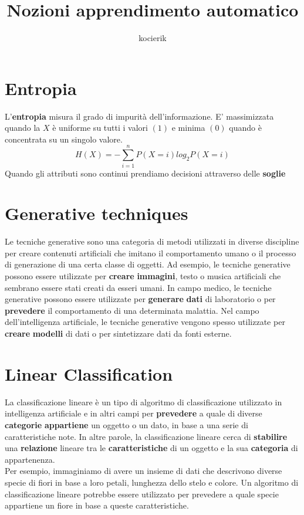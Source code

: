 \documentclass{article}
\title{Nozioni apprendimento automatico}
\author{kocierik}
\begin{document}
\maketitle
\tableofcontents

\newpage

\section{Entropia}
L'\textbf{entropia} misura il grado di impurità dell'informazione. E' massimizzata quando la $X$ è uniforme su tutti i valori $(1)$ e minima $(0)$ quando è concentrata su un singolo valore.
$$H(X) = - \sum_{i=1}^n P(X=i)log_2P(X=i)$$
Quando gli attributi sono continui prendiamo decisioni attraverso delle \textbf{soglie}

\section{Generative techniques}
Le tecniche generative sono una categoria di metodi utilizzati in diverse discipline per creare contenuti artificiali che imitano il comportamento umano o il processo di generazione di una certa classe di oggetti. Ad esempio, le tecniche generative possono essere utilizzate per \textbf{creare} \textbf{immagini}, testo o musica artificiali che sembrano essere stati creati da esseri umani. In campo medico, le tecniche generative possono essere utilizzate per \textbf{generare} \textbf{dati} di laboratorio o per \textbf{prevedere} il comportamento di una determinata malattia. Nel campo dell'intelligenza artificiale, le tecniche generative vengono spesso utilizzate per \textbf{creare} \textbf{modelli} di dati o per sintetizzare dati da fonti esterne.

\section{Linear Classification}
La classificazione lineare è un tipo di algoritmo di classificazione utilizzato in intelligenza artificiale e in altri campi per \textbf{prevedere} a quale di diverse \textbf{categorie} \textbf{appartiene} un oggetto o un dato, in base a una serie di caratteristiche note. In altre parole, la classificazione lineare cerca di \textbf{stabilire} una \textbf{relazione} lineare tra le \textbf{caratteristiche} di un oggetto e la sua \textbf{categoria} di appartenenza.\\

Per esempio, immaginiamo di avere un insieme di dati che descrivono diverse specie di fiori in base a loro petali, lunghezza dello stelo e colore. Un algoritmo di classificazione lineare potrebbe essere utilizzato per prevedere a quale specie appartiene un fiore in base a queste caratteristiche. \\
\end{document}
